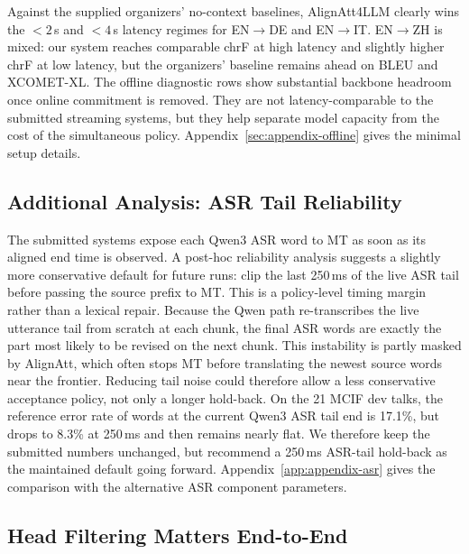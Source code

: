 \documentclass[11pt]{article}
\def\Aref#1{Appendix~\ref{#1}}
\def\AAName{AlignAtt4LLM}
\begin{document}
Against the supplied organizers' no-context baselines, \AAName{} clearly wins
the $<2$\,s and $<4$\,s latency regimes for EN$\to$DE and EN$\to$IT.
EN$\to$ZH is mixed: our system reaches comparable chrF at high latency and
slightly higher chrF at low latency, but the organizers' baseline remains ahead
on BLEU and XCOMET-XL.
The offline diagnostic rows show substantial backbone headroom once online
commitment is removed. They are not latency-comparable to the submitted
streaming systems, but they help separate model capacity from the cost of the
simultaneous policy. \Aref{sec:appendix-offline} gives the minimal setup
details.

\subsection{Additional Analysis: ASR Tail Reliability}
\label{sec:asr-tail-analysis}

The submitted systems expose each Qwen3 ASR word to MT as soon as its aligned
end time is observed. A post-hoc reliability analysis suggests a slightly more
conservative default for future runs: clip the last 250\,ms of the live ASR
tail before passing the source prefix to MT. This is a policy-level timing
margin rather than a lexical repair. Because the Qwen path re-transcribes the
live utterance tail from scratch at each chunk, the final ASR words are exactly
the part most likely to be revised on the next chunk. This instability is partly
masked by AlignAtt, which often stops MT before translating the newest source
words near the frontier. Reducing tail noise could therefore allow a less
conservative acceptance policy, not only a longer hold-back. On the 21 MCIF dev talks,
the reference error rate of words at the current Qwen3 ASR tail end is 17.1\%,
but drops to 8.3\% at 250\,ms and then remains nearly flat. We therefore keep
the submitted numbers unchanged, but recommend a 250\,ms ASR-tail hold-back as
the maintained default going forward. \Aref{app:appendix-asr} gives
the comparison with the alternative ASR component parameters.



\subsection{Head Filtering Matters End-to-End}
\label{sec:head-filtering}
\end{document}
